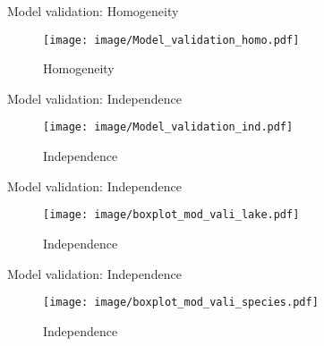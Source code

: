 \documentclass[unknownkeysallowed]{beamer}
\begin{document}
\begin{frame}{Model validation: Homogeneity}

\begin{figure}
    \centering
    \texttt{[image: image/Model\_validation\_homo.pdf]}
    \caption{Homogeneity}
    \label{fig:my_label}
\end{figure}

\end{frame}

\begin{frame}{Model validation: Independence}

\begin{figure}
    \centering
    \texttt{[image: image/Model\_validation\_ind.pdf]}
    \caption{Independence}
    \label{fig:my_label}
\end{figure}

\end{frame}

\begin{frame}{Model validation: Independence}

\begin{figure}
    \centering
    \texttt{[image: image/boxplot\_mod\_vali\_lake.pdf]}
    \caption{Independence}
    \label{fig:my_label}
\end{figure}

\end{frame}

\begin{frame}{Model validation: Independence}

\begin{figure}
    \centering
    \texttt{[image: image/boxplot\_mod\_vali\_species.pdf]}
    \caption{Independence}
    \label{fig:my_label}
\end{figure}

\end{frame}
\end{document}
